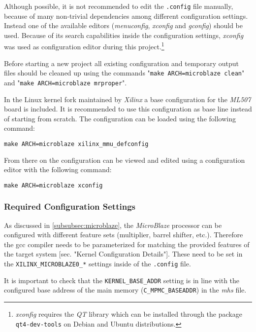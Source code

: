 Although possible, it is not recommended to edit the \texttt{.config} file manually, because of many non-trivial dependencies among different configuration settings. Instead one of the available editors (\textit{menuconfig}, \textit{xconfig} and \textit{gconfig}) should be used. Because of its search capabilities inside the configuration settings, \textit{xconfig} was used as configuration editor during this project.\footnote{\textit{xconfig} requires the \textit{QT} library which can be installed through the package \texttt{qt4-dev-tools} on Debian and Ubuntu distributions.}

Before starting a new project all existing configuration and temporary output files should be cleaned up using the commands "\texttt{make ARCH=microblaze clean}" and "\texttt{make ARCH=microblaze mrproper}".

In the Linux kernel fork maintained by \textit{Xilinx} a base configuration for the \textit{ML507} board is included. It is recommended to use this configuration as base line instead of starting from scratch. The configuration can be loaded using the following command:

\begin{verbatim}
make ARCH=microblaze xilinx_mmu_defconfig
\end{verbatim}

From there on the configuration can be viewed and edited using a configuration editor with the following command:
\begin{verbatim}
make ARCH=microblaze xconfig
\end{verbatim}

\subsubsection{Required Configuration Settings}
\label{subsubsec:req_config}

As discussed in \ref{subsubsec:microblaze}, the \textit{MicroBlaze} processor can be configured with different feature sets (multiplier, barrel shifter, etc.). Therefore the \gls{gcc} compiler needs to be parameterized for matching the provided features of the target system \cite{mb_linux}[sec. "Kernel Configuration Details"]. These need to be set in the \texttt{XILINX\_MICROBLAZE0\_*} settings inside of the \texttt{.config} file.

It is important to check that the \texttt{KERNEL\_BASE\_ADDR} setting is in line with the configured base address of the main memory (\texttt{C\_MPMC\_BASEADDR}) in the \textit{\gls{mhs}} file.

